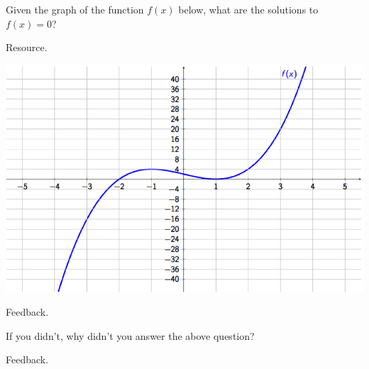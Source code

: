 \documentclass{ximera}
\begin{document}
\begin{question} 
    Given the graph of the function $f(x)$ below, what are the solutions to $f(x) = 0$?
    
    \begin{hint}
    Resource.
    \end{hint}
       
\begin{center} \includegraphics[scale=0.7]{Graphing1.png} \end{center}
    
  \begin{multipleChoice}
      
     \begin{feedback}[attempt]
      Feedback.
      \end{feedback}
     
  \end{multipleChoice}
  
\begin{question}
  
  If you didn't, why didn't you answer the above question?
  
  \begin{multipleChoice}
      
      \begin{feedback}[attempt]
      Feedback.
      \end{feedback}
      
  \end{multipleChoice}
  
\end{question}

\end{question}
\end{document}
